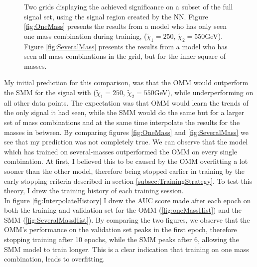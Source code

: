 \begin{figure}
{\begin{subfigure}{.6\textwidth}
    \end{subfigure}
    }
    \caption[Two grids displaying the achieved significance on a subset of the full signal set, using the signal region 
    created by two dense \ac{NN}'s, each training on different amounts of signal.]{Two grids displaying the achieved significance 
    on a subset of the full signal set, using the signal region created by the \ac{NN}. Figure \ref{fig:OneMass} presents the results 
    from a model who has only seen one mass combination during training, ($\tilde{\chi}_1=250$, $\tilde{\chi}_2=550$GeV). Figure 
    \ref{fig:SeveralMass} presents the results from a model who has seen all mass combinations in the grid, but for the inner square of masses. }
    \label{fig:Interpolation}
\end{figure}
My initial prediction for this comparison, was that the \ac{OMM} would outperform the \ac{SMM} for the signal with
($\tilde{\chi}_1=250$, $\tilde{\chi}_2=550$GeV), while underperforming on all other data points. The expectation was that \ac{OMM} 
would learn the trends of the only signal it had seen, while the \ac{SMM} would do the same but for a larger set of mass combinations and 
at the same time interpolate the results for the masses in between. By comparing figures \ref{fig:OneMass} and \ref{fig:SeveralMass} we 
see that my prediction was not completely true. We can observe that the model which has trained on several-masses outperformed the 
\ac{OMM} on every single combination. At first, I believed this to be caused by the \ac{OMM} overfitting a lot sooner than the other 
model, therefore being stopped earlier in training by the early stopping criteria described in section \ref{subsec:TrainingStrategy}. 
To test this theory, I drew the training history of each training session.
\\
In figure \ref{fig:InterpolateHistory} I drew the \ac{AUC} score made after each epoch on both the training and validation set
for the \ac{OMM} (\ref{fig:oneMassHist}) and the \ac{SMM} (\ref{fig:SeveralMassHist}). By comparing the two figures,
we observe that the \ac{OMM}'s performance on the validation set peaks in the first epoch, therefore stopping training after 
10 epochs, while the \ac{SMM} peaks after 6, allowing the \ac{SMM} model to train longer. This is a clear indication that training on one mass combination, leads 
to overfitting. 
